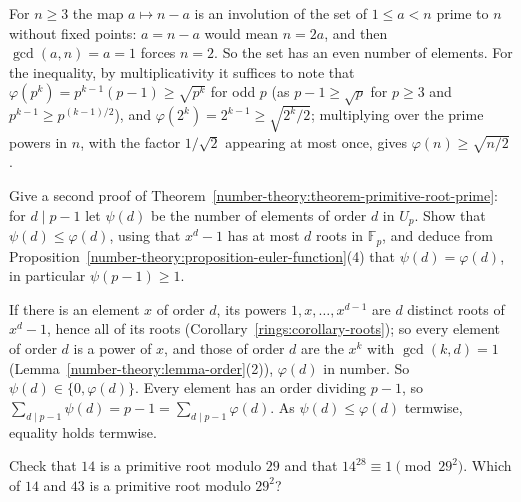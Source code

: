 \begin{solution}
For $n \geq 3$ the map $a \mapsto n - a$ is an involution of the set of $1 \leq a < n$ prime to $n$ without fixed points: $a = n - a$ would mean $n = 2a$, and then $\gcd(a, n) = a = 1$ forces $n = 2$. So
the set has an even number of elements. For the inequality, by multiplicativity it suffices to note that $\varphi(p^k) = p^{k-1}(p - 1) \geq \sqrt{p^k}$ for odd $p$ (as $p - 1 \geq \sqrt{p}$ for $p \geq 3$
and $p^{k-1} \geq p^{(k-1)/2}$), and $\varphi(2^k) = 2^{k-1} \geq \sqrt{2^k/2}$; multiplying over the prime powers in $n$, with the factor $1/\sqrt{2}$ appearing at most once, gives
$\varphi(n) \geq \sqrt{n/2}$.
\end{solution}

\begin{exercise}\label{number-theory:exercise-cyclic-count}
Give a second proof of Theorem~\ref{number-theory:theorem-primitive-root-prime}: for $d \mid p - 1$ let $\psi(d)$ be the number of elements of order $d$ in $U_p$. Show that $\psi(d) \leq \varphi(d)$, using
that $x^d - 1$ has at most $d$ roots in $\mathbb{F}_p$, and deduce from Proposition~\ref{number-theory:proposition-euler-function}(4) that $\psi(d) = \varphi(d)$, in particular $\psi(p - 1) \geq 1$.
\end{exercise}

\begin{solution}
If there is an element $x$ of order $d$, its powers $1, x, \ldots, x^{d-1}$ are $d$ distinct roots of $x^d - 1$, hence all of its roots (Corollary~\ref{rings:corollary-roots}); so every element of order $d$
is a power of $x$, and those of order $d$ are the $x^k$ with $\gcd(k, d) = 1$ (Lemma~\ref{number-theory:lemma-order}(2)), $\varphi(d)$ in number. So $\psi(d) \in \{0, \varphi(d)\}$. Every element has an order
dividing $p - 1$, so $\sum_{d \mid p-1}\psi(d) = p - 1 = \sum_{d \mid p-1}\varphi(d)$. As $\psi(d) \leq \varphi(d)$ termwise, equality holds termwise.
\end{solution}

\begin{exercise}\label{number-theory:exercise-wieferich-type}
Check that $14$ is a primitive root modulo $29$ and that $14^{28} \equiv 1 \pmod{29^2}$. Which of $14$ and $43$ is a primitive root modulo $29^2$?
\end{exercise}

